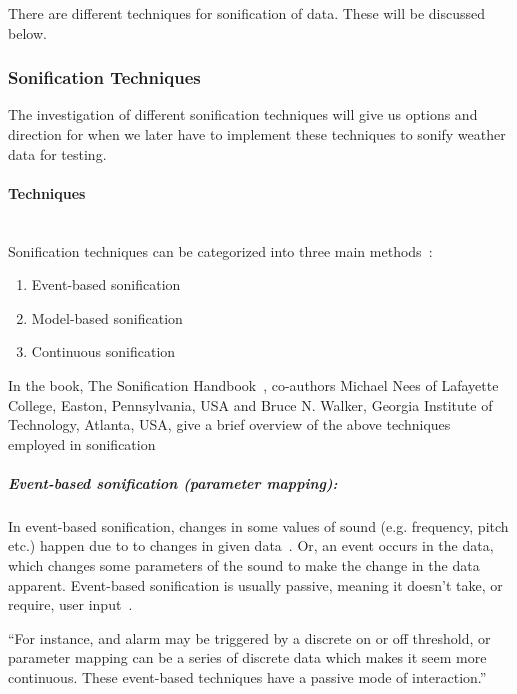 There are different techniques for sonification of data. 
These will be discussed below.



\subsubsection{Sonification Techniques} %
\label{ssub:sonification_techniques}


The investigation of different sonification techniques will give us options and direction for when we later have to implement these techniques to sonify weather data for testing.

\paragraph{Techniques} %
\label{par:techniques} \hspace{0pt} \\

Sonification techniques can be categorized into three main methods~\cite*[pp.15]{Hermann2011}:

\begin{enumerate}
    \item Event-based sonification
    \item Model-based sonification
    \item Continuous sonification
\end{enumerate}

In the book, The Sonification Handbook~\cite*{Hermann2011}, co-authors Michael Nees of Lafayette College, Easton, Pennsylvania, USA and Bruce N. Walker, Georgia Institute of Technology, Atlanta, USA, give a brief overview of the above techniques employed in sonification~\cite*[pp.16]{Hermann2011}

\subparagraph{Event-based sonification (parameter mapping):}
\label{subp:eventbased}

In event-based sonification, changes in some values of sound (e.g. frequency, pitch etc.) happen due to to changes in given data~\cite*[pp.16]{Hermann2011}. 
Or, an event occurs in the data, which changes some parameters of the sound to make the change in the data apparent. 
Event-based sonification is usually passive, meaning it doesn’t take, or require, user input~\cite*[pp.16]{Hermann2011}.

\enquote{For instance, and alarm may be triggered by a discrete on or off threshold, or parameter mapping can be a series of discrete data which makes it seem more continuous. These event-based techniques have a passive mode of interaction.}~\cite*[pp.16]{Hermann2011}

